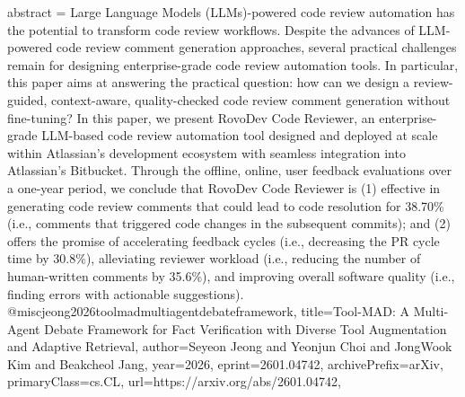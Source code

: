 {      abstract = {Large Language Models (LLMs)-powered code review automation has the potential to transform code review workflows. Despite the advances of LLM-powered code review comment generation approaches, several practical challenges remain for designing enterprise-grade code review automation tools. In particular, this paper aims at answering the practical question: how can we design a review-guided, context-aware, quality-checked code review comment generation without fine-tuning?   In this paper, we present RovoDev Code Reviewer, an enterprise-grade LLM-based code review automation tool designed and deployed at scale within Atlassian's development ecosystem with seamless integration into Atlassian's Bitbucket. Through the offline, online, user feedback evaluations over a one-year period, we conclude that RovoDev Code Reviewer is (1) effective in generating code review comments that could lead to code resolution for 38.70\% (i.e., comments that triggered code changes in the subsequent commits); and (2) offers the promise of accelerating feedback cycles (i.e., decreasing the PR cycle time by 30.8\%), alleviating reviewer workload (i.e., reducing the number of human-written comments by 35.6\%), and improving overall software quality (i.e., finding errors with actionable suggestions).}
}@misc{jeong2026toolmadmultiagentdebateframework,
      title={Tool-MAD: A Multi-Agent Debate Framework for Fact Verification with Diverse Tool Augmentation and Adaptive Retrieval}, 
      author={Seyeon Jeong and Yeonjun Choi and JongWook Kim and Beakcheol Jang},
      year={2026},
      eprint={2601.04742},
      archivePrefix={arXiv},
      primaryClass={cs.CL},
      url={https://arxiv.org/abs/2601.04742},
}
